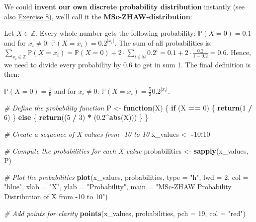\documentclass[
]{book}
\newenvironment{Shaded}{\begin{snugshade}}{\end{snugshade}}
\newcommand{\AttributeTok}[1]{\textcolor[rgb]{0.13,0.29,0.53}{#1}}
\newcommand{\CommentTok}[1]{\textcolor[rgb]{0.56,0.35,0.01}{\textit{#1}}}
\newcommand{\ControlFlowTok}[1]{\textcolor[rgb]{0.13,0.29,0.53}{\textbf{#1}}}
\newcommand{\DecValTok}[1]{\textcolor[rgb]{0.00,0.00,0.81}{#1}}
\newcommand{\FloatTok}[1]{\textcolor[rgb]{0.00,0.00,0.81}{#1}}
\newcommand{\FunctionTok}[1]{\textcolor[rgb]{0.13,0.29,0.53}{\textbf{#1}}}
\newcommand{\NormalTok}[1]{#1}
\newcommand{\OtherTok}[1]{\textcolor[rgb]{0.56,0.35,0.01}{#1}}
\newcommand{\SpecialCharTok}[1]{\textcolor[rgb]{0.81,0.36,0.00}{\textbf{#1}}}
\newcommand{\StringTok}[1]{\textcolor[rgb]{0.31,0.60,0.02}{#1}}
\begin{document}
We could \textbf{invent our own discrete probability distribution} instantly (see also \hyperref[exercise8]{Exercise 8}),
we'll call it the \textbf{MSc-ZHAW-distribution}:

Let \(X \in \mathbb{Z}\). Every whole number gets the following probability:
\(\mathbb{P}(X=0) = 0.1\) and for \(x_i \neq 0\): \(\mathbb{P}(X = x_i) = 0.2^{|x_i|}\).
The sum of all probabilities is: \(\sum_{x_i \in \mathbb{Z}} \mathbb{P}(X=x_i) = \mathbb{P}(X=0) + 2 \cdot \sum_{i \in \mathbb{N}} 0.2^i =
0.1 + 2 \cdot \frac{0.2}{1-0.2} = 0.6\). Hence, we need to divide every probability by 0.6 to get in sum 1.
The final definition is then:

\(\mathbb{P}(X=0) = \frac{1}{6}\) and for \(x_i \neq 0\): \(\mathbb{P}(X = x_i) = \frac{5}{3} 0.2^{|x_i|}\).

\begin{Shaded}
\begin{Highlighting}[]
\CommentTok{\# Define the probability function}
\NormalTok{P }\OtherTok{\textless{}{-}} \ControlFlowTok{function}\NormalTok{(X) \{}
  \ControlFlowTok{if}\NormalTok{ (X }\SpecialCharTok{==} \DecValTok{0}\NormalTok{) \{}
    \FunctionTok{return}\NormalTok{(}\DecValTok{1} \SpecialCharTok{/} \DecValTok{6}\NormalTok{)}
\NormalTok{  \} }\ControlFlowTok{else}\NormalTok{ \{}
    \FunctionTok{return}\NormalTok{((}\DecValTok{5} \SpecialCharTok{/} \DecValTok{3}\NormalTok{) }\SpecialCharTok{*}\NormalTok{ (}\FloatTok{0.2}\SpecialCharTok{\^{}}\FunctionTok{abs}\NormalTok{(X)))}
\NormalTok{  \}}
\NormalTok{\}}

\CommentTok{\# Create a sequence of X values from {-}10 to 10}
\NormalTok{x\_values }\OtherTok{\textless{}{-}} \SpecialCharTok{{-}}\DecValTok{10}\SpecialCharTok{:}\DecValTok{10}

\CommentTok{\# Compute the probabilities for each X value}
\NormalTok{probabilities }\OtherTok{\textless{}{-}} \FunctionTok{sapply}\NormalTok{(x\_values, P)}

\CommentTok{\# Plot the probabilities}
\FunctionTok{plot}\NormalTok{(x\_values, probabilities, }\AttributeTok{type =} \StringTok{"h"}\NormalTok{, }\AttributeTok{lwd =} \DecValTok{2}\NormalTok{, }\AttributeTok{col =} \StringTok{"blue"}\NormalTok{,}
     \AttributeTok{xlab =} \StringTok{"X"}\NormalTok{, }\AttributeTok{ylab =} \StringTok{"Probability"}\NormalTok{,}
     \AttributeTok{main =} \StringTok{"MSc{-}ZHAW Probability Distribution of X from {-}10 to 10"}\NormalTok{)}

\CommentTok{\# Add points for clarity}
\FunctionTok{points}\NormalTok{(x\_values, probabilities, }\AttributeTok{pch =} \DecValTok{19}\NormalTok{, }\AttributeTok{col =} \StringTok{"red"}\NormalTok{)}
\end{Highlighting}
\end{Shaded}
\end{document}
